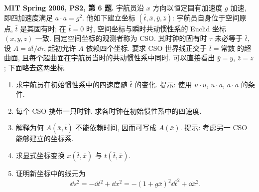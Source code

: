 \begin{exercise}
\textbf{MIT Spring 2006, PS2, 第 6 题.} 宇航员沿 $x$ 方向以恒定固有加速度 $g$ 加速, 即四加速度满足 $a\cdot a=g^2$. 他如下建立坐标 $(\bar t,\bar x,\bar y,\bar z)$: 宇航员自身位于空间原点, $\bar t$ 是其固有时; 在 $\bar t=0$ 时, 空间坐标与瞬时共动惯性系的 Euclid 坐标 $(x,y,z)$ 一致. 固定空间坐标的观测者称为 CSO. 其时钟的固有时 $\tau$ 未必等于 $\bar t$, 设 $A=\dd\bar t/\dd\tau$, 起初允许 $A$ 依赖四个坐标. 要求 CSO 世界线正交于 $\bar t=\text{常数}$ 的超曲面, 且每个超曲面在宇航员当时的共动惯性系中同时. 可以直接看出 $\bar y=y$, $\bar z=z$; 下面略去这两坐标.
\begin{enumerate}[label=(\alph*)]
\item 求宇航员在初始惯性系中的四速度随 $\bar t$ 的变化. 提示: 使用 $u\cdot u$, $u\cdot a$, $a\cdot a$ 的条件.
\item 每个 CSO 携带一只时钟. 求各时钟在初始惯性系中的四速度.
\item 解释为何 $A(\bar x,\bar t)$ 不能依赖时间, 因而可写成 $A(\bar x)$. 提示: 考虑另一 CSO 能够建立的坐标系.
\item 求显式坐标变换 $x(\bar t,\bar x)$ 与 $t(\bar t,\bar x)$.
\item 证明新坐标中的线元为
\[
 \dd s^2=-\dd t^2+\dd x^2=-(1+g\bar x)^2\dd\bar t^2+\dd\bar x^2.
\]
\end{enumerate}
\end{exercise}
